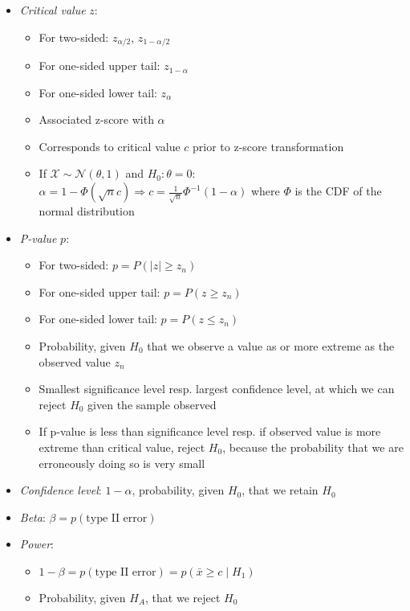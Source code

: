 \begin{itemize}
\begin{itemize}
    \end{itemize}
    \item \emph{Critical value} $z$: 
    \begin{itemize}
        \item For two-sided: $z_{\alpha/2}$, $z_{1 - \alpha/2}$
        \item For one-sided upper tail: $z_{1 - \alpha}$
        \item For one-sided lower tail: $z_{\alpha}$
        \item Associated z-score with $\alpha$
        \item Corresponds to critical value $c$ prior to z-score transformation
        \item If $\mathcal{X} \sim \mathcal{N}(\theta,1)$ and $H_0: \theta = 0$:
        $\alpha = 1-\Phi(\sqrt{n}c) \Rightarrow c = \frac{1}{\sqrt{n}} \Phi^{-1}(1 - \alpha)$ where $\Phi$ is the CDF of the normal distribution
    \end{itemize}
    \item \emph{P-value} $p$: 
    \begin{itemize}
        \item For two-sided: $p = P(|z| \geq z_n)$
        \item For one-sided upper tail: $p = P(z \geq z_n)$
        \item For one-sided lower tail: $p = P(z \leq z_n)$
        \item Probability, given $H_0$ that we observe a value as or more extreme as the observed value $z_n$ 
        \item Smallest significance level resp. largest confidence level, at which we can reject $H_0$ given the sample observed
        \item If p-value is less than significance level resp. if observed value is more extreme than critical value, reject $H_0$, because the probability that we are erroneously doing so is very small
    \end{itemize}
    \item \emph{Confidence level}: $1-\alpha$, probability, given $H_0$, that we retain $H_0$
    \item \emph{Beta}: $\beta = p(\textrm{type II error})$
    \item \emph{Power}: 
    \begin{itemize}
        \item $1-\beta = p(\textrm{type II error}) = p(\bar{x} \geq c \mid H_1)$
        \item Probability, given $H_A$, that we reject $H_0$

\end{itemize}
\end{itemize}

